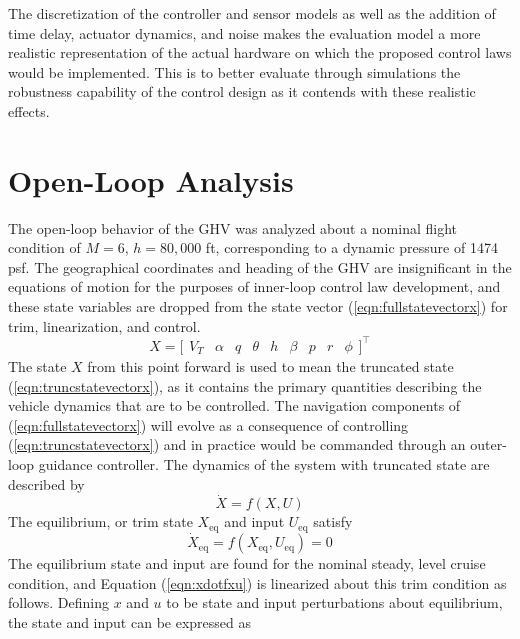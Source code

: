The discretization of the controller and sensor models as well as the addition of time delay, actuator dynamics, and noise makes the evaluation model a more realistic representation of the actual hardware on which the proposed control laws would be implemented.
This is to better evaluate through simulations the robustness capability of the control design as it contends with these realistic effects.

\section{Open-Loop Analysis}

The open-loop behavior of the GHV was analyzed about a nominal flight condition of $M=6$, $h=80,000$ ft, corresponding to a dynamic pressure of 1474 psf.
The geographical coordinates and heading of the GHV are insignificant in the equations of motion for the purposes of inner-loop control law development, and these state variables are dropped from the state vector (\ref{eqn:fullstatevectorx}) for trim, linearization, and control.
\begin{equation}
  \label{eqn:truncstatevectorx}
  X=\bigr[
  \begin{array}{ccccccccc}
    V_{T} &  \alpha & q &\theta & h & \beta &p & r & \phi
  \end{array}\bigr]^{\top}
\end{equation}
The state $X$ from this point forward is used to mean the truncated state (\ref{eqn:truncstatevectorx}), as it contains the primary quantities describing the vehicle dynamics that are to be controlled.
The navigation components of (\ref{eqn:fullstatevectorx}) will evolve as a consequence of controlling (\ref{eqn:truncstatevectorx}) and in practice would be commanded through an outer-loop guidance controller.
The dynamics of the system with truncated state are described by
\begin{equation}
  \label{eqn:xdotfxu}
  \dot{X}=f({X},U)
\end{equation}
The equilibrium, or trim state $X_{\text{eq}}$ and input $U_{\text{eq}}$ satisfy
\begin{equation}
  \label{eqn:eqptdef}
  \dot{X}_{\text{eq}}=f({X}_{\text{eq}},U_{\text{eq}})=0
\end{equation}
The equilibrium state and input are found for the nominal steady, level cruise condition, and Equation (\ref{eqn:xdotfxu}) is linearized about this trim condition as follows.
Defining $x$ and $u$ to be state and input perturbations about equilibrium, the state and input can be expressed as
